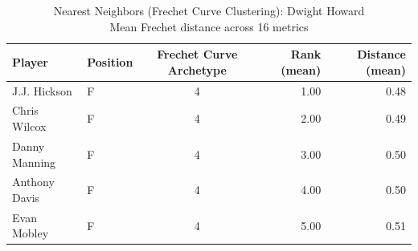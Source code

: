 \begin{table}[t]
\caption*{
{\fontsize{20}{25} Nearest Neighbors (Frechet Curve Clustering): Dwight Howard\fontsize{12}{15}\selectfont } \\ 
{\fontsize{14}{17}\selectfont  Mean Frechet distance across 16 metrics\fontsize{12}{15}\selectfont }
} 
\fontsize{12.0pt}{14.0pt}\selectfont
\begin{tabular*}{\linewidth}{@{\extracolsep{\fill}}llcrr}
\toprule
Player & Position & Frechet Curve Archetype & Rank (mean) & Distance (mean) \\ 
\midrule\addlinespace[2.5pt]
J.J. Hickson & F & 4 & 1.00 & 0.48 \\ 
Chris Wilcox & F & 4 & 2.00 & 0.49 \\ 
Danny Manning & F & 4 & 3.00 & 0.50 \\ 
Anthony Davis & F & 4 & 4.00 & 0.50 \\ 
Evan Mobley & F & 4 & 5.00 & 0.51 \\ 
\bottomrule
\end{tabular*}
\end{table}

